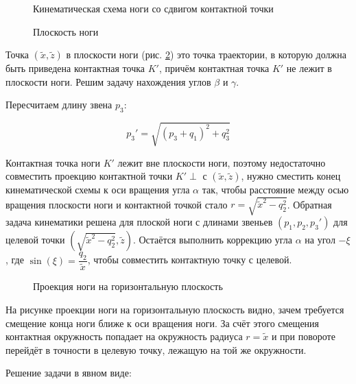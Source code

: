\begin{figure}[h]
\caption{Кинематическая схема ноги со сдвигом контактной точки}
\label{kinerror}
\end{figure}


\begin{figure}[h]
\caption{Плоскость ноги}
\label{legplane}
\end{figure}

Точка $(\tilde{x},\tilde{z})$ в плоскости ноги (рис. \ref{legplane}) это точка траектории, в которую должна быть приведена контактная точка $K'$, причём контактная точка $K'$ не лежит в плоскости ноги. Решим задачу нахождения углов $\beta$ и $\gamma$. 

Пересчитаем длину звена $p_3$:

\begin{equation}
p_3' = \sqrt{(p_3+q_1)^2+q_3^2}
\end{equation}

Контактная точка ноги $K'$ лежит вне плоскости ноги, поэтому недостаточно совместить проекцию контактной точки $K'\perp$ с $(\tilde{x},\tilde{z})$, нужно сместить конец кинематической схемы к оси вращения угла $\alpha$ так, чтобы расстояние между осью вращения плоскости ноги и контактной точкой стало $r = \sqrt{\tilde{x}^2-q_2^2}$. Обратная задача кинематики решена для плоской ноги с длинами звеньев $(p_1,p_2,p_3')$ для целевой точки $(\sqrt{\tilde{x}^2-q_2^2},\tilde{z})$. Остаётся выполнить коррекцию угла $\alpha$ на угол $-\xi$, где $\sin(\xi) = \dfrac{q_2}{\tilde{x}}$, чтобы совместить контактную точку с целевой.

\begin{figure}[h]
\caption{Проекция ноги на горизонтальную плоскость}
\end{figure}

На рисунке проекции ноги на горизонтальную плоскость видно, зачем требуется смещение конца ноги ближе к оси вращения ноги. За счёт этого смещения контактная окружность попадает на окружность радиуса $r = \tilde{x}$ и при повороте перейдёт в точности в целевую точку, лежащую на той же окружности.

Решение задачи в явном виде:

